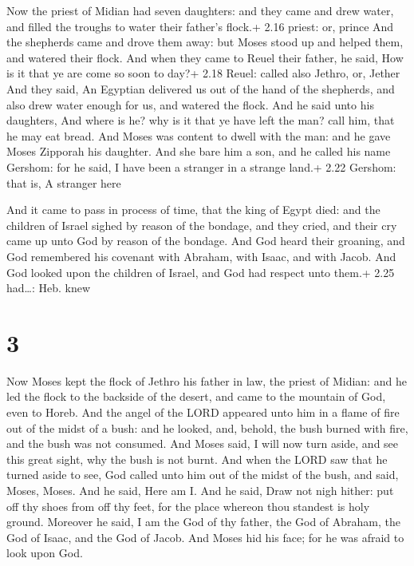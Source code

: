  Now the priest of Midian had seven daughters: and they
came and drew water, and filled the troughs to water their father's
flock.+ 2.16 priest: or, prince  And the shepherds came and
drove them away: but Moses stood up and helped them, and watered their
flock.  And when they came to Reuel their father, he said,
How is it that ye are come so soon to day?+ 2.18 Reuel: called also
Jethro, or, Jether  And they said, An Egyptian delivered us
out of the hand of the shepherds, and also drew water enough for us, and
watered the flock.  And he said unto his daughters, And
where is he? why is it that ye have left the man? call him, that he may
eat bread.  And Moses was content to dwell with the man:
and he gave Moses Zipporah his daughter.  And she bare him
a son, and he called his name Gershom: for he said, I have been a
stranger in a strange land.+ 2.22 Gershom: that is, A stranger here

 And it came to pass in process of time, that the king of
Egypt died: and the children of Israel sighed by reason of the bondage,
and they cried, and their cry came up unto God by reason of the bondage.
 And God heard their groaning, and God remembered his
covenant with Abraham, with Isaac, and with Jacob.  And God
looked upon the children of Israel, and God had respect unto them.+ 2.25
had\ldots: Heb. knew

\hypertarget{section-2}{%
\section{3}\label{section-2}}

 Now Moses kept the flock of Jethro his father in law, the
priest of Midian: and he led the flock to the backside of the desert,
and came to the mountain of God, even to Horeb.  And the
angel of the LORD appeared unto him in a flame of fire out of the midst
of a bush: and he looked, and, behold, the bush burned with fire, and
the bush was not consumed.  And Moses said, I will now turn
aside, and see this great sight, why the bush is not burnt. 
And when the LORD saw that he turned aside to see, God called unto him
out of the midst of the bush, and said, Moses, Moses. And he said, Here
am I.  And he said, Draw not nigh hither: put off thy shoes
from off thy feet, for the place whereon thou standest is holy ground.
 Moreover he said, I am the God of thy father, the God of
Abraham, the God of Isaac, and the God of Jacob. And Moses hid his face;
for he was afraid to look upon God.

